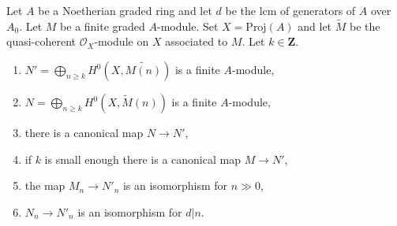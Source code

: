 \begin{lemma}
\label{lemma-recover-tail-graded-module-general}
Let $A$ be a Noetherian graded ring and let $d$ be the lcm of generators
of $A$ over $A_0$. Let $M$ be a finite graded $A$-module.
Set $X = \text{Proj}(A)$ and let $\widetilde{M}$ be
the quasi-coherent $\mathcal{O}_X$-module on $X$ associated to $M$.
Let $k \in \mathbf{Z}$.
\begin{enumerate}
\item $N' = \bigoplus_{n \geq k} H^0(X, \widetilde{M(n)})$
is a finite $A$-module,
\item $N = \bigoplus_{n \geq k} H^0(X, \widetilde{M}(n))$
is a finite $A$-module,
\item there is a canonical map $N \to N'$,
\item if $k$ is small enough there is a canonical map $M \to N'$,
\item the map $M_n \to N'_n$ is an isomorphism for $n \gg 0$,
\item $N_n \to N'_n$ is an isomorphism for $d | n$.
\end{enumerate}
\end{lemma}

